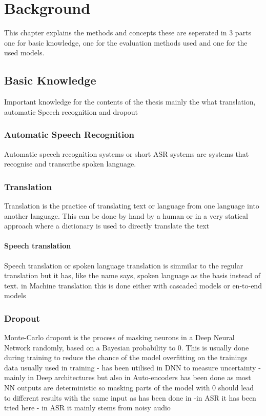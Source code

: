 \chapter{Background}
This chapter explains the methods and concepts these are seperated in 3 parts one for basic knowledge, one for the evaluation methods used and one for the used models. 

\section{Basic Knowledge}
Important knowledge for the contents of the thesis mainly the what translation, automatic Speech recognition and dropout


\subsection{Automatic Speech Recognition}
Automatic speech recognition systems or short ASR systems are systems that recognise and transcribe spoken language. 

\subsection{Translation}
Translation is the practice of translating text or language from one language into another language. This can be done by hand by a human or in a very statical approach where a dictionary is used to directly translate the text 
\subsubsection{Speech translation}
Speech translation or spoken language translation is simmilar to the regular translation but it has, like the name says, spoken language as the basis instead of text. 
in Machine translation this is done either with cascaded models or en-to-end models 


\subsection{Dropout}
Monte-Carlo dropout is the process of masking neurons in a Deep Neural Network randomly, based on a Bayesian probability to 0. This is usually done during training to reduce the chance of the model overfitting on the trainings data \cite{}
usually used in training 
- has been utilised in DNN to measure uncertainty
- mainly in Deep architectures but also in Auto-encoders
has been done as most NN outputs are deterministic so masking parts of the model with 0 should lead to different results with the same input as has been done in \cite{gal2016dropoutbayesianapproximationrepresenting}
-in ASR it has been tried here  \cite{8683086}
- in ASR it mainly stems from noisy audio 
